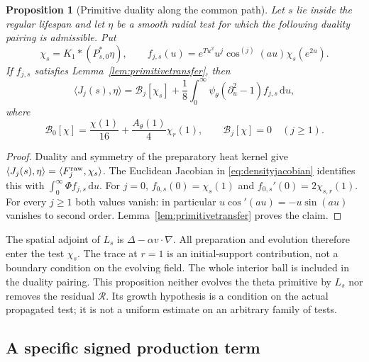 \documentclass[11pt]{article}
\numberwithin{equation}{section}
\newtheorem{proposition}[theorem]{Proposition}
\newcommand{\dd}{\,\mathrm d}
\begin{document}
\begin{proposition}[Primitive duality along the common path]
\label{prop:primitiveduality}
Let $s$ lie inside the regular lifespan and let $\eta$ be a smooth
radial test for which the following duality pairing is admissible. Put
\begin{equation}\label{eq:primitiveadjointtest}
 \chi_s=K_1*(P_{s,0}^*\eta),\qquad
 f_{j,s}(u)=e^{Tu^2}u^j\cos^{(j)}(au)\chi_s(e^{2u}).
\end{equation}
If $f_{j,s}$ satisfies Lemma~\ref{lem:primitivetransfer}, then
\begin{equation}\label{eq:primitiveevolvedpairing}
 \langle J_j(s),\eta\rangle
 =\mathcal B_j[\chi_s]
 +\frac18\int_0^\infty\psi_\theta
           (\partial_u^2-1)f_{j,s}\dd u,
\end{equation}
where
\begin{equation}\label{eq:primitivespheretrace}
 \mathcal B_0[\chi]=\frac{\chi(1)}{16}
                  +\frac{A_\theta(1)}4\chi_r(1),
 \qquad \mathcal B_j[\chi]=0\quad(j\ge1).
\end{equation}
\end{proposition}
\begin{proof}
Duality and symmetry of the preparatory heat kernel give
$\langle J_j(s),\eta\rangle=\langle F_j^{\rm raw},\chi_s\rangle$.
The Euclidean Jacobian in \eqref{eq:densityjacobian} identifies this
with $\int_0^\infty\Phi f_{j,s}\dd u$.
For $j=0$, $f_{0,s}(0)=\chi_s(1)$ and
$f_{0,s}'(0)=2\chi_{s,r}(1)$. For every $j\ge1$ both values vanish:
in particular $u\cos'(au)=-u\sin(au)$ vanishes to second order.
Lemma~\ref{lem:primitivetransfer} proves the claim.
\end{proof}

The spatial adjoint of $L_s$ is $\Delta-\alpha v\cdot\nabla$.
All preparation and evolution therefore enter the test $\chi_s$.
The trace at $r=1$ is an initial-support contribution, not a boundary
condition on the evolving field. The whole interior ball is included
in the duality pairing. This proposition neither evolves the theta
primitive by $L_s$ nor removes the residual $\mathcal R$.
Its growth hypothesis is a condition on the actual propagated test;
it is not a uniform estimate on an arbitrary family of tests.

\subsection{A specific signed production term}
\end{document}
